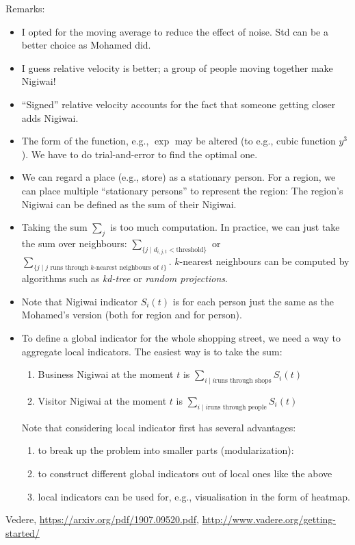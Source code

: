 \documentclass[a4paper,12pt]{amsart}
\theoremstyle{definition}
\numberwithin{equation}{section}
\begin{document}
Remarks:
\begin{itemize}
\item I opted for the moving average to reduce the effect of noise. Std can be a better choice as Mohamed did.
\item I guess relative velocity is better; a group of people moving together make Nigiwai!
\item ``Signed'' relative velocity accounts for the fact that someone getting closer adds Nigiwai.
\item The form of the function, e.g., $\exp$ may be altered (to e.g., cubic function $y^3$).
 We have to do trial-and-error to find the optimal one.
\item We can regard a place (e.g., store) as a stationary person.
For a region, we can place multiple ``stationary persons'' to represent the region:
The region's Nigiwai can be defined as the sum of their Nigiwai.
\item Taking the sum $\sum_{j}$ is too much computation.
In practice, we can just take the sum over neighbours:
$\sum_{ \{j \mid d_{i,j,t}< \text{threshold} \}}$
or $\sum_{ \{j \mid j \text{ runs through $k$-nearest neighbours of $i$} \}}$.
$k$-nearest neighbours can be computed by algorithms such as \emph{kd-tree} or \emph{random projections}.
\item Note that Nigiwai indicator $S_i(t)$ is for each person just the same as the Mohamed's version (both for region and for person).
\item To define a global indicator for the whole shopping street, 
we need a way to aggregate local indicators.
The easiest way is to take the sum: 
\begin{enumerate}
\item Business Nigiwai at the moment $t$ is $\sum_{i\mid i \text{runs through shops}} S_i(t)$
\item Visitor Nigiwai at the moment $t$ is $\sum_{i\mid i \text{runs through people}} S_i(t)$
\end{enumerate}
Note that considering local indicator first has several advantages:
\begin{enumerate}
\item to break up the problem into smaller parts (modularization):
\item to construct different global indicators out of local ones like the above
\item local indicators can be used for, e.g., visualisation in the form of heatmap.
\end{enumerate}

\end{itemize}


\begin{thebibliography}{99}
 Vedere,
\url{https://arxiv.org/pdf/1907.09520.pdf}, 
\url{http://www.vadere.org/getting-started/}
 
\end{thebibliography} 
\end{document}
